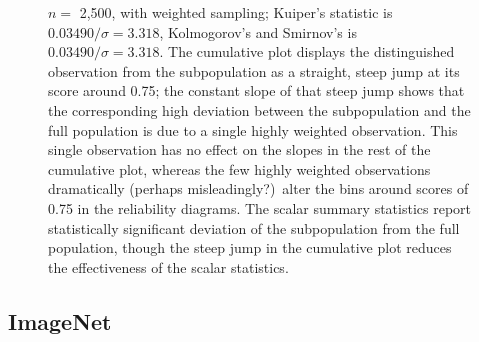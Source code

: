 \documentclass{article}
\begin{document}
\begin{figure}
\begin{centering}
\end{centering}
\caption{$n =$ 2,500, with weighted sampling;
         Kuiper's statistic is $0.03490 / \sigma = 3.318$,
         Kolmogorov's and Smirnov's is $0.03490 / \sigma = 3.318$.
The cumulative plot displays the distinguished observation
from the subpopulation as a straight, steep jump at its score around 0.75;
the constant slope of that steep jump shows that the corresponding
high deviation between the subpopulation and the full population
is due to a single highly weighted observation. This single observation has
no effect on the slopes in the rest of the cumulative plot,
whereas the few highly weighted observations dramatically
(perhaps misleadingly?)\
alter the bins around scores of 0.75 in the reliability diagrams.
The scalar summary statistics report
statistically significant deviation of the subpopulation
from the full population, though the steep jump in the cumulative plot
reduces the effectiveness of the scalar statistics.
}
\label{2500w}
\end{figure}



\subsection{ImageNet}
\label{imagenetex}
\end{document}
